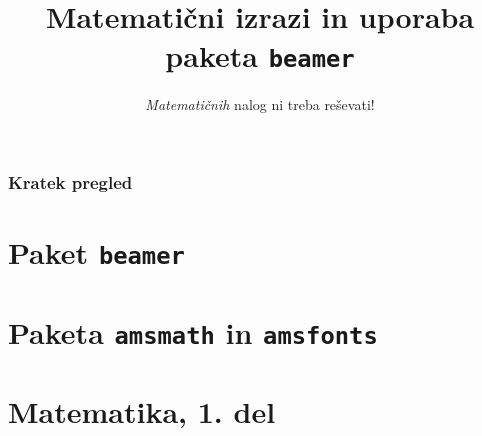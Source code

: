 \documentclass{beamer}
\begin{document}
\begin{frame}
    \title{Matematični izrazi in uporaba paketa \texttt{beamer}}
    \subtitle{\emph{Matematičnih} nalog ni treba reševati!}
    \date{}
\end{frame}


\begin{frame}
    \frametitle{Kratek pregled}
    \tableofcontents%
\end{frame}



\section{Paket \texttt{beamer}}
\begin{frame}
\pause
\end{frame}

\section{Paketa \texttt{amsmath} in \texttt{amsfonts}}
\begin{frame}
    
\end{frame}

\section[Matematika, 1. del\\\large{Analiza, logika, množice}]{Matematika, 1. del}
\begin{frame}
    
\end{frame}
\end{document}
